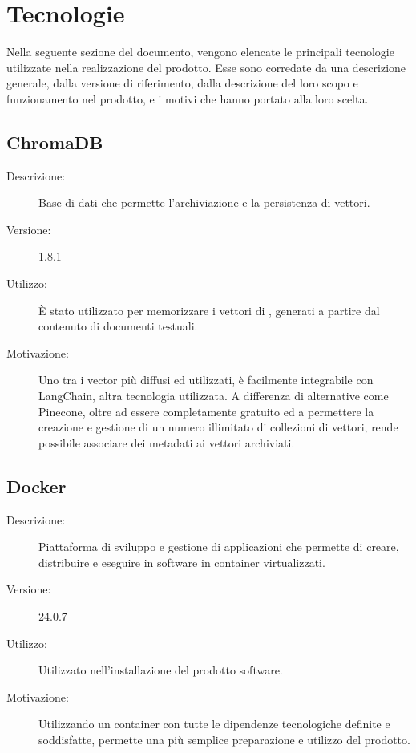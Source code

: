 \chapter{Tecnologie} \label{cap:tech}
Nella seguente sezione del documento, vengono elencate le principali tecnologie utilizzate nella realizzazione del prodotto. Esse sono corredate da una descrizione generale, dalla versione di riferimento, dalla descrizione del loro scopo e funzionamento nel prodotto, e i motivi che hanno portato alla loro scelta.

\section{ChromaDB}
\begin{description}
\item[Descrizione:] Base di dati che permette l'archiviazione e la persistenza di vettori.
\item[Versione:] 1.8.1
\item[Utilizzo:] È stato utilizzato per memorizzare i vettori di , generati a partire dal contenuto di documenti testuali.
\item[Motivazione:] Uno tra i vector  più diffusi ed utilizzati, è facilmente integrabile con LangChain, altra tecnologia utilizzata. A differenza di alternative come Pinecone, oltre ad essere completamente gratuito ed a permettere la creazione e gestione di un numero illimitato di collezioni di vettori, rende possibile associare dei metadati ai vettori archiviati.
\end{description}

\section{Docker}
\begin{description}
\item[Descrizione:] Piattaforma di sviluppo e gestione di applicazioni che permette di creare, distribuire e eseguire in  software in container virtualizzati.
\item[Versione:] 24.0.7
\item[Utilizzo:] Utilizzato nell'installazione del prodotto software.
\item[Motivazione:] Utilizzando un container con tutte le dipendenze tecnologiche definite e soddisfatte, permette una più semplice preparazione e utilizzo del prodotto.
\end{description}


